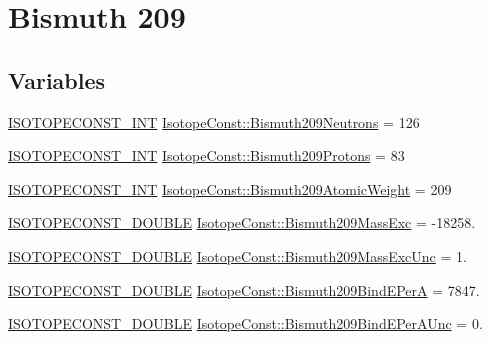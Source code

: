 \hypertarget{group___isotope_const-_bismuth-_bi209}{}\section{Bismuth 209}
\label{group___isotope_const-_bismuth-_bi209}
\subsection*{Variables}
\begin{DoxyCompactItemize}
\item 
\mbox{\hyperlink{group___isotope_const-_macros_ga5f18360b3e99483a35c32d789e62621c}{I\+S\+O\+T\+O\+P\+E\+C\+O\+N\+S\+T\+\_\+\+I\+NT}} \mbox{\hyperlink{group___isotope_const-_bismuth-_bi209_ga7ab7833f92d56d78d373b46cbe53867e}{Isotope\+Const\+::\+Bismuth209\+Neutrons}} = 126
\item 
\mbox{\hyperlink{group___isotope_const-_macros_ga5f18360b3e99483a35c32d789e62621c}{I\+S\+O\+T\+O\+P\+E\+C\+O\+N\+S\+T\+\_\+\+I\+NT}} \mbox{\hyperlink{group___isotope_const-_bismuth-_bi209_ga1e81e7aada2efc8201cb6afcabf527ff}{Isotope\+Const\+::\+Bismuth209\+Protons}} = 83
\item 
\mbox{\hyperlink{group___isotope_const-_macros_ga5f18360b3e99483a35c32d789e62621c}{I\+S\+O\+T\+O\+P\+E\+C\+O\+N\+S\+T\+\_\+\+I\+NT}} \mbox{\hyperlink{group___isotope_const-_bismuth-_bi209_gaf7d96ea2caef5ade2fa3199965810b28}{Isotope\+Const\+::\+Bismuth209\+Atomic\+Weight}} = 209
\item 
\mbox{\hyperlink{group___isotope_const-_macros_ga8f45a7272ce02c0b4c65c44636ed719a}{I\+S\+O\+T\+O\+P\+E\+C\+O\+N\+S\+T\+\_\+\+D\+O\+U\+B\+LE}} \mbox{\hyperlink{group___isotope_const-_bismuth-_bi209_ga00a2cfb450e471ce6f220e419a29e735}{Isotope\+Const\+::\+Bismuth209\+Mass\+Exc}} = -\/18258.
\item 
\mbox{\hyperlink{group___isotope_const-_macros_ga8f45a7272ce02c0b4c65c44636ed719a}{I\+S\+O\+T\+O\+P\+E\+C\+O\+N\+S\+T\+\_\+\+D\+O\+U\+B\+LE}} \mbox{\hyperlink{group___isotope_const-_bismuth-_bi209_ga74f3691c0b5cfb9594aba62089c5817d}{Isotope\+Const\+::\+Bismuth209\+Mass\+Exc\+Unc}} = 1.
\item 
\mbox{\hyperlink{group___isotope_const-_macros_ga8f45a7272ce02c0b4c65c44636ed719a}{I\+S\+O\+T\+O\+P\+E\+C\+O\+N\+S\+T\+\_\+\+D\+O\+U\+B\+LE}} \mbox{\hyperlink{group___isotope_const-_bismuth-_bi209_gadd850add0dfb665a9e4eb5fab67fe3c2}{Isotope\+Const\+::\+Bismuth209\+Bind\+E\+PerA}} = 7847.
\item 
\mbox{\hyperlink{group___isotope_const-_macros_ga8f45a7272ce02c0b4c65c44636ed719a}{I\+S\+O\+T\+O\+P\+E\+C\+O\+N\+S\+T\+\_\+\+D\+O\+U\+B\+LE}} \mbox{\hyperlink{group___isotope_const-_bismuth-_bi209_ga25e41ccd098628eae3ecfa76243dfefa}{Isotope\+Const\+::\+Bismuth209\+Bind\+E\+Per\+A\+Unc}} = 0.

\end{DoxyCompactItemize}
